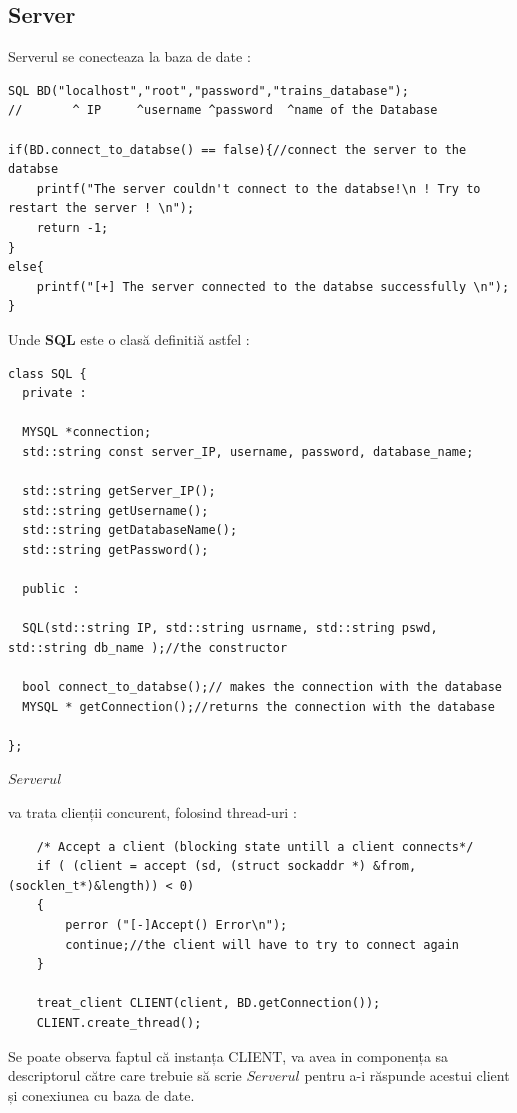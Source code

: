 \documentclass[runningheads]{llncs}
\begin{document}
\subsection{Server}
 Serverul se conecteaza la baza de date : 
 \label{sec:serverDataBase}
    \begin{verbatim} 
SQL BD("localhost","root","password","trains_database");
//       ^ IP     ^username ^password  ^name of the Database

if(BD.connect_to_databse() == false){//connect the server to the databse
    printf("The server couldn't connect to the databse!\n ! Try to restart the server ! \n");
    return -1;
}
else{
    printf("[+] The server connected to the databse successfully \n");
}
    \end{verbatim} 
Unde \textbf{SQL} este o clasă definitiă astfel : 
\begin{verbatim}
class SQL {
  private :

  MYSQL *connection;
  std::string const server_IP, username, password, database_name;

  std::string getServer_IP();
  std::string getUsername();
  std::string getDatabaseName();
  std::string getPassword();
    
  public :

  SQL(std::string IP, std::string usrname, std::string pswd, std::string db_name );//the constructor

  bool connect_to_databse();// makes the connection with the database
  MYSQL * getConnection();//returns the connection with the database

};
\end{verbatim}
\hypertarget{sec:ServerCreateThread}{$Serverul $} va trata clienții concurent, folosind thread-uri : 
\begin{verbatim}
    /* Accept a client (blocking state untill a client connects*/
    if ( (client = accept (sd, (struct sockaddr *) &from, (socklen_t*)&length)) < 0)
    {
        perror ("[-]Accept() Error\n");
        continue;//the client will have to try to connect again
    }
    
    treat_client CLIENT(client, BD.getConnection());
    CLIENT.create_thread();
\end{verbatim}
Se poate observa faptul că instanța CLIENT, va avea in componența sa descriptorul către care trebuie să scrie $Serverul$ pentru a-i răspunde acestui client și conexiunea cu baza de date.
\end{document}
